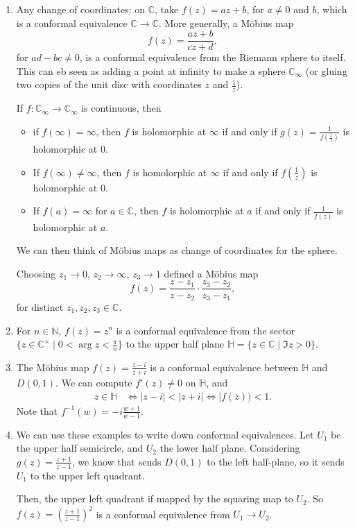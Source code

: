 \documentclass[12pt]{article}
\begin{document}
\begin{exbox}
	\begin{enumerate}[1.]
		\item Any change of coordinates: on $\mathbb{C}$, take $f(z) = az + b$, for $a \neq 0$ and $b$, which is a conformal equivalence $\mathbb{C} \to \mathbb{C}$. More generally, a M\"{o}bius map
			\[
			f(z) = \frac{az + b}{cz + d},
			\]
			for $ad - bc \neq 0$, is a conformal equivalence from the Riemann sphere to itself. This can eb seen as adding a point at infinity to make a sphere $\mathbb{C}_{\infty}$ (or gluing two copies of the unit disc with coordinates $z$ and $\frac{1}{z}$).

			If $f : \mathbb{C}_{\infty} \to \mathbb{C}_{\infty}$ is continuous, then
			\begin{itemize}
				\item if $f(\infty) = \infty$, then $f$ is holomorphic at $\infty$ if and only if $g(z) = \frac{1}{f(\frac{1}{z})}$ is holomorphic at $0$.
				\item If $f(\infty) \neq \infty$, then $f$ is homolorphic at $\infty$ if and only if $f(\frac{1}{z})$ is holomorphic at $0$.
				\item If $f(a) = \infty$ for $a \in \mathbb{C}$, then $f$ is holomorphic at $a$ if and only if $\frac{1}{f(z)}$ is holomorphic at $a$.
			\end{itemize}
			We can then think of M\"{o}bius maps as change of coordinates for the sphere.

			Choosing $z_1 \to 0$, $z_2 \to \infty$, $z_3 \to 1$ defined a M\"{o}bius map
			\[
			f(z) = \frac{z - z_1}{z - z_2} \cdot \frac{z_3 - z_2}{z_3 - z_1}
			,\]
			for distinct $z_1, z_2, z_3 \in \mathbb{C}$.
		\item For $n \in \mathbb{N}$, $f(z) = z^{n}$ is a conformal equivalence from the sector $\{z \in \mathbb{C}^{\times} \mid 0 < \arg z < \frac{\pi}{n}\}$ to the upper half plane $\mathbb{H} = \{z \in \mathbb{C} \mid \Im z > 0\}$.
		\item The M\"{o}bius map $f(z) = \frac{z-i}{z+i}$ is a conformal equivalence between $\mathbb{H}$ and $D(0,1)$. We can compute $f'(z) \neq 0$ on $\mathbb{H}$, and
			\begin{align*}
				z \in \mathbb{H} & \iff |z-i| < |z+i| \iff |f(z)) < 1.
			\end{align*}
			Note that $f^{-1}(w) = -i \frac{w+1}{w-1}$.
		\item We can use these examples to write down conformal equivalences. Let $U_1$ be the upper half semicircle, and $U_2$ the lower half plane. Considering $g(z) = \frac{z+1}{z-1}$, we know that sends $D(0,1)$ to the left half-plane, so it sends $U_1$ to the upper left quadrant.

			Then, the upper left quadrant if mapped by the squaring map to $U_2$. So $f(z) = (\frac{z+1}{z-1})^2$ is a conformal equivalence from $U_1 \to U_2$.
	\end{enumerate}
\end{exbox}
\end{document}
